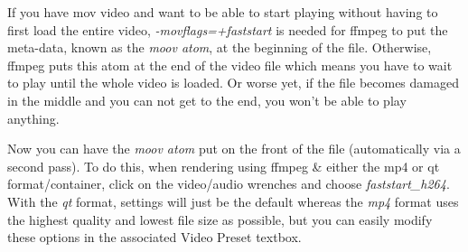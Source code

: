 If you have mov video and want to be able to start playing without having to first load the entire video, \textit{-movflags=+faststart} is needed for ffmpeg to put the meta-data, known as the \textit{moov atom}, at the beginning of the file.  Otherwise, ffmpeg puts this atom at the end of the video file which means you have to wait to play until the whole video is loaded.  Or worse yet, if the file becomes damaged in the middle and you can not get to the end, you won’t be able to play anything.

Now you can have the \textit{moov atom} put on the front of the file (automatically via a second pass).  To do this, when rendering using ffmpeg \& either the mp4 or qt format/container, click on the video/audio wrenches and choose \textit{faststart\_h264}.   With the \textit{qt} format, settings will just be the default whereas the \textit{mp4} format uses the highest quality and lowest file size as possible, but you can easily modify these options in the associated Video Preset textbox.

